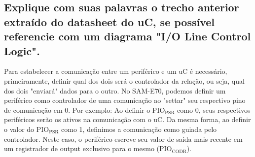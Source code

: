 \documentclass[11pt]{article}
\begin{document}
\subsection{Explique com suas palavras o trecho anterior extraído do datasheet do uC, se possível referencie com um diagrama "I/O Line Control Logic".}
\label{sec:orgheadline10}
Para estabelecer a comunicação entre um periférico e um uC é necessário, primeiramente, definir qual dos dois será
o controlador da relação, ou seja, qual dos dois "enviará" dados para o outro. No SAM-E70, podemos definir um
periférico como controlador de uma comunicação ao "settar" seu respectivo pino de comunicação em 0. Por exemplo:
Ao definir o PIO\(_{\text{PSR}}\) como 0, seus respectivos periféricos serão os ativos na comunicação com o uC. Da mesma forma,
ao definir o valor do PIO\(_{\text{PSR}}\) como 1, definimos a comunicação como guiada pelo controlador. Neste caso, o
periférico escreve seu valor de saída mais recente em um registrador de output exclusivo para o mesmo (PIO\(_{\text{CODR}}\)).
\end{document}
